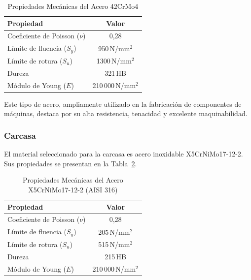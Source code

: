 \documentclass[conference]{IEEEtran}
\begin{document}
\begin{table}[H]
\centering
\caption{Propiedades Mecánicas del Acero 42CrMo4 \cite{ovako2026}}
\label{tab:propiedades-c45}
\begin{tabular}{lc}
\hline
\textbf{Propiedad} & \textbf{Valor} \\
\hline
Coeficiente de Poisson ($\nu$) & 0{,}28                     \\
Límite de fluencia ($S_y$)     & 950\,N/mm$^2$              \\
Límite de rotura ($S_u$)       & 1300\,N/mm$^2$             \\
Dureza                         & 321\,HB                    \\
Módulo de Young ($E$)          & 210\,000\,N/mm$^2$         \\
\hline
\end{tabular}
\end{table}

Este tipo de acero, ampliamente utilizado en la fabricación de componentes de máquinas,
destaca por su alta resistencia, tenacidad y excelente maquinabilidad.

\subsubsection{Carcasa}

El material seleccionado para la carcasa es acero inoxidable X5CrNiMo17-12-2. Sus
propiedades se presentan en la Tabla~\ref{tab:propiedades-aisi316}.

\begin{table}[H]
\centering
\caption{Propiedades Mecánicas del Acero X5CrNiMo17-12-2 (AISI 316) \cite{agst}}
\label{tab:propiedades-aisi316}
\begin{tabular}{lc}
\hline
\textbf{Propiedad} & \textbf{Valor} \\
\hline
Coeficiente de Poisson ($\nu$) & 0{,}28                     \\
Límite de fluencia ($S_y$)     & 205\,N/mm$^2$              \\
Límite de rotura ($S_u$)       & 515\,N/mm$^2$              \\
Dureza                         & 215\,HB                    \\
Módulo de Young ($E$)          & 210\,000\,N/mm$^2$         \\
\hline
\end{tabular}
\end{table}
\end{document}
